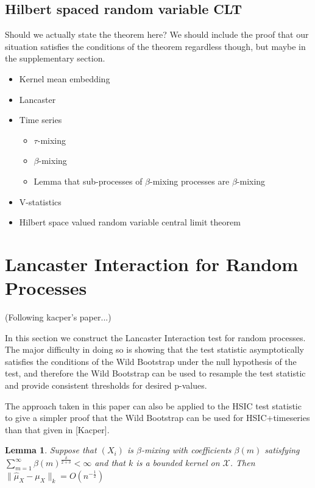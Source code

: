 \documentclass{article}
\newtheorem{lemma}{Lemma}
\begin{document}
\subsection{Hilbert spaced random variable CLT}

Should we actually state the theorem here? We should include the proof that our situation satisfies the conditions of the theorem regardless though, but maybe in the supplementary section.


\begin{itemize}
\item Kernel mean embedding
\item Lancaster
\item Time series
\begin{itemize}
\item $\tau$-mixing
\item $\beta$-mixing
\item Lemma that sub-processes of $\beta$-mixing processes are $\beta$-mixing
\end{itemize}
\item V-statistics
\item Hilbert space valued random variable central limit theorem
\end{itemize} 

\section{Lancaster Interaction for Random Processes}

(Following kacper's paper...)

In this section we construct the Lancaster Interaction test for random processes. The major difficulty in doing so is showing that the test statistic asymptotically satisfies the conditions of the Wild Bootstrap under the null hypothesis of the test, and therefore the Wild Bootstrap can be used to resample the test statistic and provide consistent thresholds for desired p-values.

The approach taken in this paper can also be applied to the HSIC test statistic to give a simpler proof that the Wild Bootstrap can be used for HSIC+timeseries than that given in [Kacper].

\begin{lemma}\label{lemma:hilbertCLT}
Suppose that $(X_i)$ is $\beta$-mixing with coefficients $\beta(m)$ satisfying $\sum_{m=1}^{\infty}\beta(m)^{\frac{\delta}{2+\delta}}<\infty$ and that $k$ is a bounded kernel on $\mathcal{X}$. Then $\|\hat\mu_X - \mu_X\|_k = O(n^{-\frac{1}{2}})$

\end{lemma}
\end{document}
